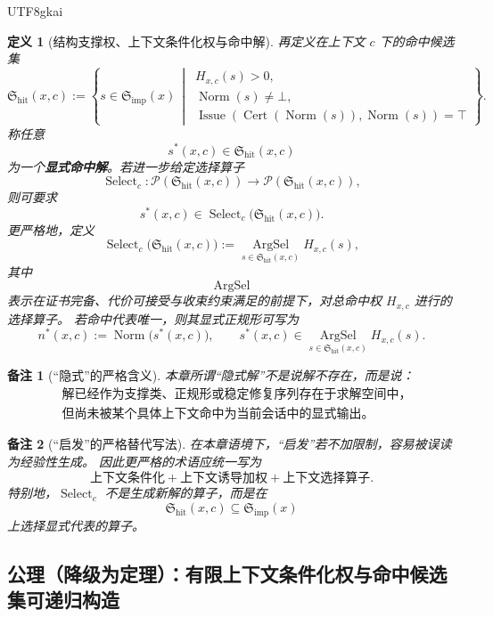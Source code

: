 \documentclass[12pt]{article}
\newtheorem{definition}{定义}[section]
\newtheorem{remark}{备注}[section]
\newcommand{\Norm}{\operatorname{Norm}}
\newcommand{\Cert}{\operatorname{Cert}}
\newcommand{\Issue}{\operatorname{Issue}}
\newcommand{\Select}{\operatorname{Select}}
\begin{document}
\begin{CJK*}{UTF8}{gkai}
\begin{definition}[结构支撑权、上下文条件化权与命中解]
再定义在上下文 $c$ 下的命中候选集
\[
  \mathfrak S_{\mathrm{hit}}(x,c)
  :=
  \left\{
    s\in \mathfrak S_{\mathrm{imp}}(x)
    \,\middle|\,
    \begin{array}{l}
      H_{x,c}(s)>0,\\
      \Norm(s)\neq \bot,\\
      \Issue(\Cert(\Norm(s)),\Norm(s))=\top
    \end{array}
  \right\}.
\]
称任意
\[
  s^\ast(x,c)\in \mathfrak S_{\mathrm{hit}}(x,c)
\]
为一个\textbf{显式命中解}。若进一步给定选择算子
\[
  \Select_c:\mathcal P(\mathfrak S_{\mathrm{hit}}(x,c))\to \mathcal P(\mathfrak S_{\mathrm{hit}}(x,c)),
\]
则可要求
\[
  s^\ast(x,c)\in \Select_c\bigl(\mathfrak S_{\mathrm{hit}}(x,c)\bigr).
\]
更严格地，定义
\[
  \Select_c\bigl(\mathfrak S_{\mathrm{hit}}(x,c)\bigr)
  :=
  \operatorname*{ArgSel}_{s\in \mathfrak S_{\mathrm{hit}}(x,c)}
  H_{x,c}(s),
\]
其中
\[
  \operatorname*{ArgSel}
\]
表示在证书完备、代价可接受与收束约束满足的前提下，对总命中权 $H_{x,c}$ 进行的选择算子。
若命中代表唯一，则其显式正规形可写为
\[
  n^\ast(x,c):=\Norm\bigl(s^\ast(x,c)\bigr),
  \qquad
  s^\ast(x,c)\in \operatorname*{ArgSel}_{s\in \mathfrak S_{\mathrm{hit}}(x,c)} H_{x,c}(s).
\]
\end{definition}

\begin{remark}[“隐式”的严格含义]
本章所谓“隐式解”不是说解不存在，而是说：
\[
  \boxed{
    \begin{aligned}
      &\text{解已经作为支撑类、正规形或稳定修复序列存在于求解空间中，}\\
      &\text{但尚未被某个具体上下文命中为当前会话中的显式输出。}
    \end{aligned}
  }
\]
\end{remark}

\begin{remark}[“启发”的严格替代写法]
在本章语境下，“启发”若不加限制，容易被误读为经验性生成。
因此更严格的术语应统一写为
\[
  \boxed{
    \text{上下文条件化}
    +
    \text{上下文诱导加权}
    +
    \text{上下文选择算子}.
  }
\]
特别地，$\Select_c$ 不是生成新解的算子，而是在
\[
  \mathfrak S_{\mathrm{hit}}(x,c)\subseteq \mathfrak S_{\mathrm{imp}}(x)
\]
上选择显式代表的算子。
\end{remark}

\subsection{公理（降级为定理）：有限上下文条件化权与命中候选集可递归构造}
\label{subsec:tex37-ch15-axiom}


\end{CJK*}
\end{document}
